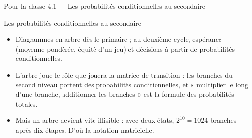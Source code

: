\begin{frame}{Pour la classe 4.1 --- Les probabilités conditionnelles au secondaire}
  \begin{Classe}{Les probabilités conditionnelles au secondaire}
    \small
    \begin{itemize}
      \item Diagrammes en arbre dès le primaire ; au deuxième cycle,
        espérance (moyenne pondérée, équité d'un jeu) et décisions à
        partir de probabilités conditionnelles.
      \item L'arbre joue le rôle que jouera la matrice de transition :
        les branches du second niveau portent des probabilités
        conditionnelles, et « multiplier le long d'une branche,
        additionner les branches » est la formule des probabilités
        totales.
      \item Mais un arbre devient vite illisible : avec deux états,
        $2^{10}=1024$ branches après dix étapes. D'où la notation
        matricielle.
    \end{itemize}
  \end{Classe}
\end{frame}
